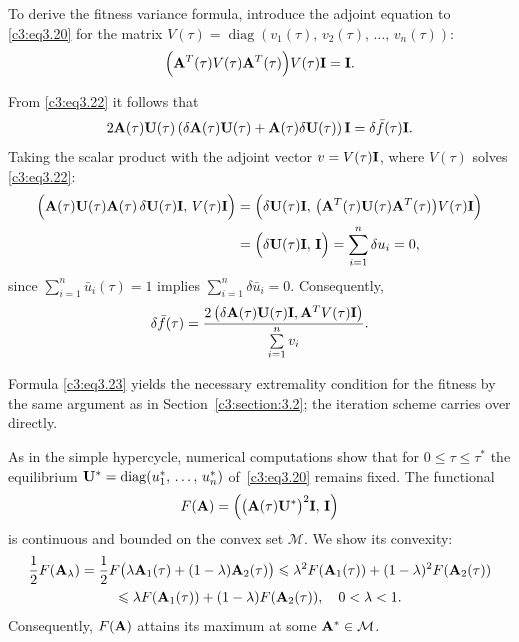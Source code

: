\documentclass[12pt]{report}
\DeclareMathOperator{\diag}{diag}
\theoremstyle{definition}
\theoremstyle{remark}
\begin{document}
To derive the fitness variance formula, introduce the adjoint equation to \eqref{c3:eq3.20} for the matrix $V(\tau) = \diag (v_1(\tau),\, v_2(\tau), \, \ldots, \, v_n(\tau))$:
\begin{equation}\label{c3:eq3.22}
	\Big({\bf A}^T(\tau)V(\tau){\bf A}^T(\tau)\Big)V(\tau){\bf I}={\bf I}.
\end{equation}

From \eqref{c3:eq3.22} it follows that
\begin{equation*}
	2{\bf A}(\tau){\bf U}(\tau)\left(\delta {\bf A}(\tau){\bf U}(\tau)+{\bf A}(\tau) \delta {\bf U}(\tau)\right){\bf I} = \delta \bar{f}(\tau){\bf I}.
\end{equation*}
Taking the scalar product with the adjoint vector $v = V(\tau){\bf I}$, where $V(\tau)$ solves \eqref{c3:eq3.22}:
\begin{align*}
	\Big({\bf A}(\tau){\bf U}(\tau){\bf A}(\tau)\,\delta{\bf U}(\tau){\bf I},\,
	V(\tau){\bf I}\Big)
	&= \Big(\delta{\bf U}(\tau){\bf I},\,
	\big({\bf A}^T(\tau){\bf U}(\tau){\bf A}^T(\tau)\big)V(\tau){\bf I}\Big) \\
	&= \Big(\delta{\bf U}(\tau){\bf I},\, {\bf I}\Big)
	= \sum_{i=1}^n \delta u_i = 0,
\end{align*}
since $\sum\limits_{i=1}^n \bar{u}_i(\tau)=1$ implies $\sum\limits_{i=1}^n \delta \bar{u}_i=0$. Consequently,
\begin{equation}\label{c3:eq3.23}
	\delta\bar{f}(\tau) = \dfrac{2\left(\delta {\bf A}(\tau){\bf U}(\tau){\bf I}, {\bf A}^TV(\tau){\bf I}\right)}{\sum\limits_{i=1}^n v_i }.
\end{equation}

Formula \eqref{c3:eq3.23} yields the necessary extremality condition for the fitness by the same argument as in Section~\ref{c3:section:3.2}; the iteration scheme carries over directly.

As in the simple hypercycle, numerical computations show that for
$0 \leqslant \tau \leqslant \tau^*$ the equilibrium
${\bf U}^* = \diag(u_1^*,\, \ldots,\, u_n^*)$ of~\eqref{c3:eq3.20} remains fixed.
The functional
\begin{equation*}
	F({\bf A}) = \Big(\big({\bf A}(\tau){\bf U}^*\big)^2{\bf I},\, {\bf I}\Big)
\end{equation*}
is continuous and bounded on the convex set $\mathcal{M}$. We show its convexity:
\begin{multline*}
	\dfrac{1}{2} F({\bf A}_{\lambda})
	= \dfrac{1}{2} F\big(\lambda {\bf A}_1(\tau) + (1-\lambda) {\bf A}_2(\tau)\big)
	\leqslant \lambda^2 F({\bf A}_1(\tau)) + (1-\lambda)^2 F({\bf A}_2(\tau)) \\
	\leqslant \lambda F({\bf A}_1(\tau)) + (1-\lambda) F({\bf A}_2(\tau)),
	\quad 0 < \lambda < 1.
\end{multline*}
Consequently, $F({\bf A})$ attains its maximum at some ${\bf A}^* \in \mathcal{M}$.
\end{document}
